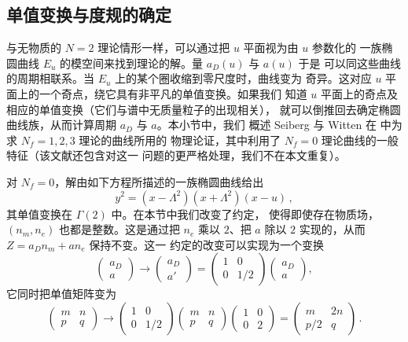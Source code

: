 \subsection{单值变换与度规的确定}

与无物质的 $N=2$ 理论情形一样，可以通过把 $u$ 平面视为由 $u$ 参数化的
一族椭圆曲线 $E_u$ 的模空间来找到理论的解。量 $a_D(u)$ 与 $a(u)$ 于是
可以同这些曲线的周期相联系。当 $E_u$ 上的某个圈收缩到零尺度时，曲线变为
奇异。这对应 $u$ 平面上的一个奇点，绕它具有非平凡的单值变换。如果我们
知道 $u$ 平面上的奇点及相应的单值变换（它们与谱中无质量粒子的出现相关），
就可以倒推回去确定椭圆曲线族，从而计算周期 $a_D$ 与 $a$。本小节中，我们
概述 Seiberg 与 Witten 在 \cite{SW2} 中为求 $N_f=1,2,3$ 理论的曲线所用的
物理论证，其中利用了 $N_f=0$ 理论曲线的一般特征（该文献还包含对这一
问题的更严格处理，我们不在本文重复）。

对 $N_f = 0$，解由如下方程所描述的一族椭圆曲线给出
$$
y^2 = (x - \Lambda^2 )(x + \Lambda ^2 )(x-u) \,,
$$
其单值变换在 $\Gamma(2)$ 中。在本节中我们改变了约定，
使得即使存在物质场，$(n_m , n_e )$ 也都是整数。这是通过把 $n_e$ 乘以
$2$、把 $a$ 除以 $2$ 实现的，从而 $Z = a_D n_m + a n_e$ 保持不变。这一
约定的改变可以实现为一个变换
$$
\left ( \begin{array}{cc} a_D \\ a \end{array} \right ) \rightarrow
\left ( \begin{array}{cc} a_D \\ a' \end{array} \right ) =
\left ( \begin{array}{cc} 1 & 0 \\ 0 & 1/2 \end{array} \right )
\left ( \begin{array}{cc} a_D \\ a \end{array} \right ),
$$
它同时把单值矩阵变为
$$
\left ( \begin{array}{cc} m & n \\ p & q \end{array} \right )
\rightarrow
\left ( \begin{array}{cc} 1 & 0 \\ 0 & 1/2 \end{array} \right )
\left ( \begin{array}{cc} m & n \\ p & q \end{array} \right )
\left ( \begin{array}{cc} 1 & 0 \\ 0 & 2 \end{array} \right ) =
\left ( \begin{array}{cc} m & 2n \\ p/2 & q \end{array} \right )\,.
$$

